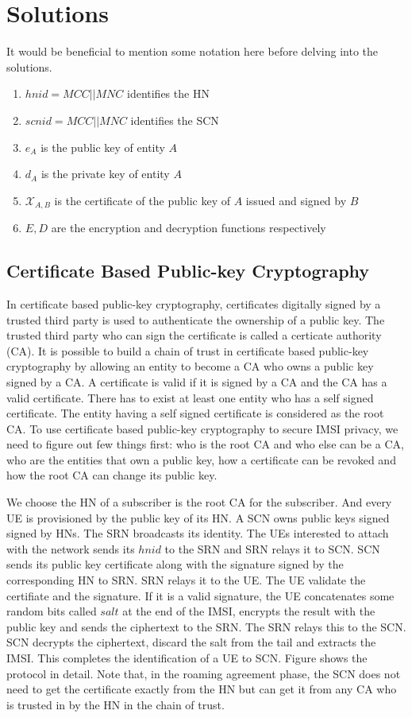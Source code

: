 \documentclass[lnicst,sechang,a4paper]{svmultln}
\begin{document}
\section{Solutions}\label{sec:solutions} 
\label{sec:solutions}
It would be beneficial to mention some notation here before delving into the solutions. 
\begin{enumerate}
\item $hnid=MCC||MNC$ identifies the HN
\item $scnid=MCC||MNC$ identifies the SCN
\item $e_A$ is the public key of entity $A$
\item $d_A$ is the private key of entity $A$ 
\item $\mathcal{X}_{A,B}$ is the certificate of the public key of $A$ issued and signed by $B$
\item $E,D$ are the encryption and decryption functions respectively
\end{enumerate}


\subsection{Certificate Based Public-key Cryptography} 
\label{sub_sec:solution_certificate}
In certificate based public-key cryptography, certificates digitally signed by a trusted third party is used to authenticate the ownership of a public key. The trusted third party who can sign the certificate is called a certicate authority (CA). It is possible to build a chain of trust in certificate based public-key cryptography by allowing an entity to become a CA who owns a public key signed by a CA. A certificate is valid if it is signed by a CA and the CA has a valid certificate. There has to exist at least one entity who has a self signed certificate. The entity having a self signed certificate is considered as the root CA. To use certificate based public-key cryptography to secure IMSI privacy, we need to figure out few things first: who is the root CA and who else can be a CA, who are the entities that own a public key,  how a certificate can be revoked and how the root CA can change its public key.

We choose the HN of a subscriber is the root CA for the subscriber. And every UE is provisioned by the public key of its HN. A SCN owns  public keys signed signed by HNs. The SRN broadcasts its identity. The UEs interested to attach with the network sends its $hnid$ to the SRN and SRN relays it to SCN. SCN sends its public key certificate along with the signature signed by the corresponding HN to SRN. SRN relays it to the UE. The UE validate the certifiate and the signature. If it is a valid signature, the UE concatenates some random bits called $salt$ at the end of the IMSI, encrypts the result with the public key and sends the ciphertext to the SRN. The SRN relays this to the SCN. SCN decrypts the ciphertext, discard the salt from the tail and extracts the IMSI. This completes the identification of a UE to SCN. Figure \label{fig:protocol_public_key_variation1} shows the protocol in detail. Note that, in the roaming agreement phase, the SCN does not need to get the certificate exactly from the HN but can get it from any CA who is trusted in by the HN in the chain of trust.
\end{document}
